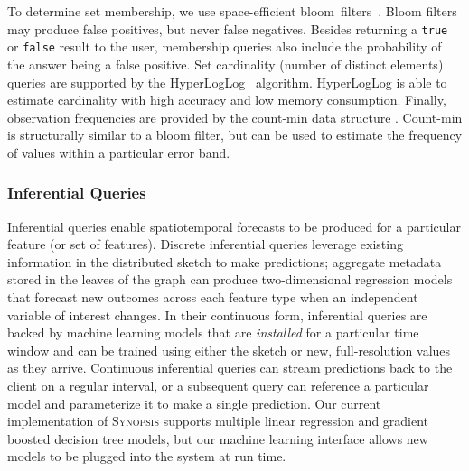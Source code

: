 To determine set membership, we use space-efficient bloom~filters~\cite{bloom1970space}. Bloom filters may produce false positives, but never false negatives. Besides returning a \texttt{true} or \texttt{false} result to the user, membership queries also include the probability of the answer being a false positive.  Set cardinality (number of distinct elements) queries are supported by the HyperLogLog~\cite{flajolet2007hyperloglog} algorithm. HyperLogLog is able to estimate cardinality with high accuracy and low memory consumption. Finally, observation frequencies are provided by the count-min data structure \cite{cormode2005improved}. Count-min is structurally similar to a bloom filter, but can be used to estimate the frequency of values within a particular error band.

\subsubsection{Inferential Queries}
Inferential queries enable spatiotemporal forecasts to be produced for a particular feature (or set of features). Discrete inferential queries leverage existing information in the distributed sketch to make predictions; aggregate metadata stored in the leaves of the graph can produce two-dimensional regression models that forecast new outcomes across each feature type when an independent variable of interest changes. In their continuous form, inferential queries are backed by machine learning models that are \emph{installed} for a particular time window and can be trained using either the sketch or new, full-resolution values as they arrive. Continuous inferential queries can stream predictions back to the client on a regular interval, or a subsequent query can reference a particular model and parameterize it to make a single prediction. Our current implementation of \textsc{Synopsis} supports multiple linear regression and gradient boosted decision tree models, but our machine learning interface allows new models to be plugged into the system at run time.
